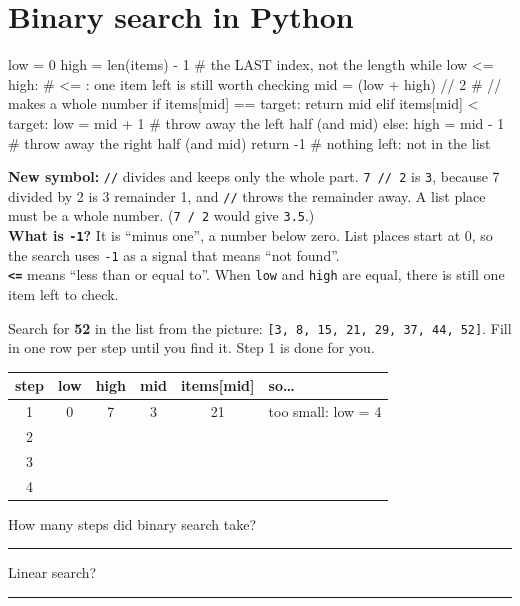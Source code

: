 \section{Binary search in Python}
\begin{pycode}
low = 0
high = len(items) - 1          # the LAST index, not the length
while low <= high:             # <= : one item left is still worth checking
    mid = (low + high) // 2    # // makes a whole number
    if items[mid] == target:
        return mid
    elif items[mid] < target:
        low = mid + 1          # throw away the left half (and mid)
    else:
        high = mid - 1         # throw away the right half (and mid)
return -1                      # nothing left: not in the list
\end{pycode}
\textbf{New symbol:} \texttt{//} divides and keeps only the whole part. \texttt{7 // 2} is \texttt{3}, because 7 divided by 2 is 3 remainder 1, and \texttt{//} throws the remainder away. A list place must be a whole number. (\texttt{7 / 2} would give \texttt{3.5}.)\\
\textbf{What is \texttt{-1}?} It is \enquote{minus one}, a number below zero. List places start at 0, so the search uses \texttt{-1} as a signal that means \enquote{not found}.\\
\textbf{\texttt{<=}} means \enquote{less than or equal to}. When \texttt{low} and \texttt{high} are equal, there is still one item left to check.

\begin{tip}
Search for \textbf{52} in the list from the picture: \texttt{[3, 8, 15, 21, 29, 37, 44, 52]}. Fill in one row per step until you find it. Step 1 is done for you.
\begin{center}
\renewcommand{\arraystretch}{1.35}
\begin{tabular}{|c|c|c|c|c|p{4.2cm}|}
\hline
\textbf{step} & \textbf{low} & \textbf{high} & \textbf{mid} & \textbf{items[mid]} & \textbf{so\ldots} \\ \hline
1 & 0 & 7 & 3 & 21 & too small: low = 4 \\ \hline
2 & & & & & \\ \hline
3 & & & & & \\ \hline
4 & & & & & \\ \hline
\end{tabular}
\end{center}
How many steps did binary search take? \rule{1.5cm}{0.4pt}\quad Linear search? \rule{1.5cm}{0.4pt}
\end{tip}

